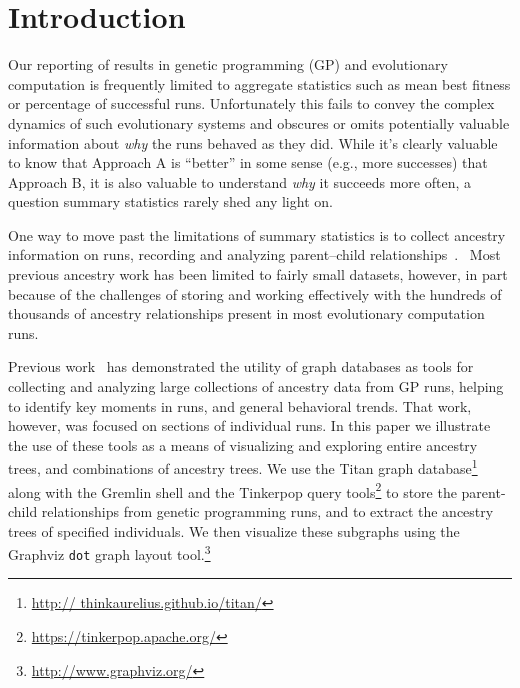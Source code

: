 \documentclass{sig-alternate}
\begin{document}

\printccsdesc


\section{Introduction}
\label{sec:introduction}

Our reporting of results in genetic programming (GP) and evolutionary computation 
is frequently limited to aggregate statistics such as mean best fitness or 
percentage of successful runs. Unfortunately this fails to convey the complex 
dynamics of such evolutionary systems and obscures or omits potentially valuable 
information about \emph{why} the runs behaved as they did. While it's clearly
valuable to know that Approach A is ``better'' in some sense (e.g., more successes)
that Approach B, it is also valuable to understand \emph{why} it succeeds more 
often, a question summary statistics rarely shed any light on.

One way to move past the limitations of summary statistics is to collect ancestry
information on runs, recording and analyzing parent--child 
relationships~\cite{hart2001gavel,burlacu2013visualization,vaseux2013event,cruz2015elicit}. \
Most previous ancestry
work has been limited to fairly small datasets, however, in part because of the
challenges of storing and working effectively with the hundreds of thousands of
ancestry relationships present in most evolutionary computation runs.

Previous work~\cite{McPhee:2015:GPTP} has demonstrated the utility of graph databases as 
tools for collecting and analyzing large collections of ancestry data from GP runs,
helping to identify key moments in runs, and general behavioral trends. That work,
however, was focused on sections of individual runs. In this paper we illustrate the 
use of these tools as a means of visualizing and exploring entire 
ancestry trees, and combinations of ancestry trees. 
We use the Titan graph database\footnote{\url{http://
thinkaurelius.github.io/titan/}} along with the Gremlin shell and the Tinkerpop query 
tools\footnote{\url{https://tinkerpop.apache.org/}} to store the parent-child 
relationships from genetic programming runs, and to extract the ancestry trees of 
specified individuals. We then visualize these subgraphs using the Graphviz \texttt{dot} 
graph layout tool.\footnote{\url{http://www.graphviz.org/}}
\end{document}
